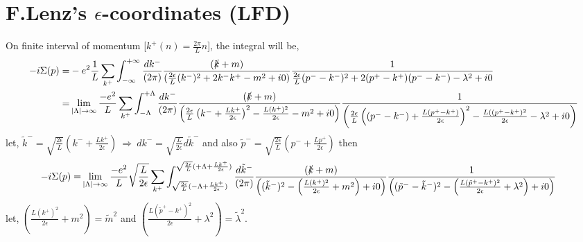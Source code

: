 \documentclass[]{article}
\numberwithin{equation}{section}
\begin{document}
\pagebreak
\section{F.Lenz's $\epsilon$-coordinates (LFD)}
On finite interval of momentum [$k^+(n)=\frac{2\pi}{L}n$], the integral will be,
\begin{align}
    -i\Sigma(p)=&-e^2\frac{1}{L}\sum_{k^+}\int_{-\infty}^{+\infty}\frac{dk^-}{(2\pi)}\frac{(\slashed{k}+m)}{(\frac{2\epsilon}{L}(k^{-})^2+2k^-k^+-m^2+i0)}\frac{1}{\frac{2\epsilon}{L}(p^--k^-)^2+2(p^+-k^+)(p^--k^-)-\lambda^2+i0}\\
    =&\lim\limits_{|\Lambda| \to \infty}\frac{-e^2}{L}\sum_{k^+}\int_{-\Lambda}^{+\Lambda}\frac{dk^-}{(2\pi)}\frac{(\slashed{k}+m)}{\left(\frac{2\epsilon}{L}\left(k^-+\frac{Lk^+}{2\epsilon}\right)^2-\frac{L(k^{+})^2}{2\epsilon}-m^2+i0\right)}\frac{1}{\left(\frac{2\epsilon}{L}\left((p^--k^-)+\frac{L(p^+-k^+)}{2\epsilon}\right)^2-\frac{L((p^+-k^{+})^2}{2\epsilon}-\lambda^2+i0\right)}\nonumber
\end{align}
let, $\tilde{k}^-=\sqrt{\frac{2\epsilon}{L}}\left(k^-+\frac{Lk^+}{2\epsilon}\right)~\Longrightarrow~dk^-=\sqrt{\frac{L}{2\epsilon}}d\tilde{k}^-$ and also  $\tilde{p}^-=\sqrt{\frac{2\epsilon}{L}}\left(p^-+\frac{Lp^+}{2\epsilon}\right)$ then
\begin{align}
    -i\Sigma(p)=&\lim\limits_{|\Lambda| \to \infty}\frac{-e^2}{L}\sqrt{\frac{L}{2\epsilon}}\sum_{k^+}\int_{\sqrt{\frac{2\epsilon}{L}}(-\Lambda+\frac{Lk^+}{2\epsilon})}^{\sqrt{\frac{2\epsilon}{L}}(+\Lambda+\frac{Lk^+}{2\epsilon})}\frac{d\tilde{k}^-}{(2\pi)}\frac{(\slashed{k}+m)}{\left((\tilde{k}^-)^2-\left(\frac{L(k^{+})^2}{2\epsilon}+m^2\right)+i0\right)}\frac{1}{\left((\tilde{p}^--\tilde{k}^-)^2-\left(\frac{L(\tilde{p}^+-k^{+})^2}{2\epsilon}+\lambda^2\right)+i0\right)}
\end{align}
let, $\left(\frac{L(k^{+})^2}{2\epsilon}+m^2\right)=\tilde{m}^2$ and $\left(\frac{L(\tilde{p}^+-k^{+})^2}{2\epsilon}+\lambda^2\right)=\tilde{\lambda}^2$. 
\end{document}

